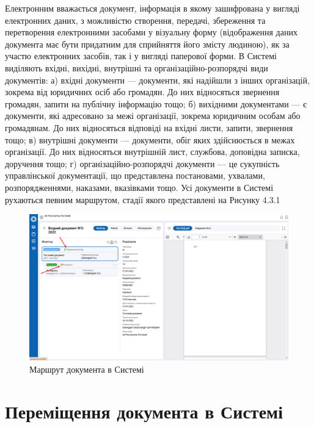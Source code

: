 Електронним вважається документ, інформація в якому зашифрована у вигляді
електронних даних, з можливістю створення, передачі, збереження та
перетворення електронними засобами у візуальну форму (відображення даних
документа має бути придатним для сприйняття його змісту людиною), як за
участю електронних засобів, так і у вигляді паперової форми.
В Системі виділяють вхідні, вихідні, внутрішні та організаційно-розпорядчі види
документів:
а) вхідні документи --- документи, які надійшли з інших організацій, зокрема від
юридичних осіб або громадян. До них відносяться звернення громадян, запити на
публічну інформацію тощо;
б) вихідними документами --- є документи, які адресовано за межі організації,
зокрема юридичним особам або громадянам. До них відносяться відповіді на
вхідні листи, запити, звернення тощо;
в) внутрішні документи --- документи, обіг яких здійснюється в межах організації.
До них відносяться внутрішній лист, службова, доповідна записка, доручення
тощо;
г) організаційно-розпорядчі документи --- це сукупність управлінської
документації, що представлена постановами, ухвалами, розпорядженнями,
наказами, вказівками тощо.
Усі документи в Системі рухаються певним маршрутом, стадії якого представлені
на Рисунку 4.3.1

\begin{figure}[!htbp]
\centerline{\includegraphics[width=\textwidth]{img/4.3.1.png}}
\caption{Маршрут документа в Системі}
\end{figure}

\newpage

\section{Переміщення документа в Системі}

